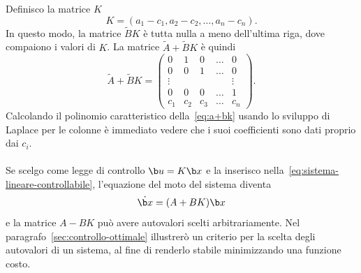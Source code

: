 \begin{steps}
    \item Definisco la matrice $K$
    \begin{equation*}
        K = (a_1 - c_1, a_2 - c_2, \ldots, a_n - c_n).
    \end{equation*}
    In questo modo, la matrice $\tilde BK$ è tutta nulla a meno dell'ultima riga, dove
    compaiono i valori di $K$.
    La matrice $\tilde A + \tilde BK$ è quindi
    \begin{equation}
        \tilde A + \tilde BK = \left(
        \begin{array}{ccccc}
            0 &1 &0 &\ldots &0 \\
            0 &0 &1 &\ldots &0 \\
            \vdots & & & &  \vdots\\
            0 &0 &0 &\ldots &1 \\
            c_1 &c_2 &c_3 &\ldots &c_n
        \end{array}
        \right).
        \label{eq:a+bk}
    \end{equation}
    Calcolando il polinomio caratteristico della~\eqref{eq:a+bk}
    usando lo sviluppo di Laplace per le colonne è immediato
    vedere che i suoi coefficienti sono dati proprio dai $c_i$.
\end{steps}
\hfill \qedsymbol \paragraph{}

Se scelgo come legge di controllo $\b u = K \b x$ e la inserisco
nella~\eqref{eq:sistema-lineare-controllabile}, l'equazione del moto del sistema
diventa
\begin{equation}
    \dot {\b x} = (A + BK) \b x
    \label{eq:controlled-eigenvalues-equation}
\end{equation}
e la matrice $A - BK$ può avere autovalori scelti arbitrariamente.
Nel paragrafo~\ref{sec:controllo-ottimale} illustrerò un criterio per la scelta
degli autovalori di un sistema, al fine di renderlo stabile minimizzando
una funzione costo.


